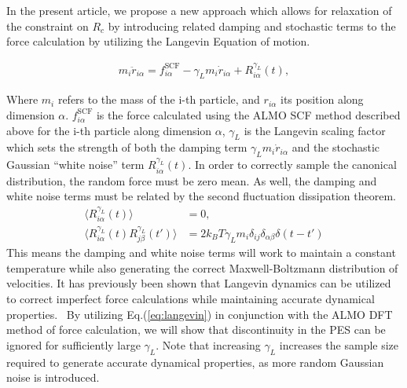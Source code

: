\documentclass[10pt,aps,prl,twocolumn,amsmath,amssymb,superscriptaddress,longbibliography]{revtex4-1}
\begin{document}
In the present article, we propose a new approach which allows for relaxation of the constraint on $R_{c}$ by introducing related damping and stochastic terms to the force calculation by utilizing the Langevin Equation of motion.~\cite{a:Kubo-1986}

\begin{align}
\label{eq:langevin}
m_i \ddot{r}_{i\alpha} = f^{\text{SCF}}_{i\alpha} - \gamma_L m_i \dot{r}_{i\alpha} + R^{\gamma_L}_{i\alpha} (t),
\end{align}

Where $m_i$ refers to the mass of the i-th particle, and $r_{i\alpha}$ its position along dimension $\alpha$. 
$f^{\text{SCF}}_{i\alpha}$ is the force calculated using the ALMO SCF method described above for the i-th particle along dimension $\alpha$, $\gamma_L$ is the Langevin scaling factor which sets the strength of both the damping term  $\gamma_L m_i \dot{r}_{i\alpha}$ and the stochastic Gaussian ``white noise'' term $R^{\gamma_L}_{i\alpha} (t)$. 
In order to correctly sample the canonical distribution, the random force must be zero mean. 
As well, the damping and white noise terms must be related by the second fluctuation dissipation theorem.~\cite{a:Kubo-1986,a:langevin-why,b:tuckerman-stat}
%
\begin{align}
\label{eq:stochastic}
\langle R^{\gamma_L}_{i\alpha} (t) \rangle &= 0, \\
\langle R^{\gamma_L}_{i\alpha} (t)  R^{\gamma_L}_{j\beta} (t') \rangle &= 2 k_B T \gamma_L m_i \delta_{ij} \delta_{\alpha\beta} \delta(t-t')
\end{align}
%
This means the damping and white noise terms will work to maintain a constant temperature while also generating the correct Maxwell-Boltzmann distribution of velocities. 
It has previously been shown that Langevin dynamics can be utilized to correct imperfect force calculations while maintaining accurate dynamical properties.~\cite{a:langevin-why,a:2ndcpmd,b:tuckerman-stat,a:ceriotti} 
By utilizing Eq.(\ref{eq:langevin}) in conjunction with the ALMO DFT method of force calculation, we will show that discontinuity in the PES can be ignored for sufficiently large $\gamma_L$. 
Note that increasing $\gamma_L$ increases the sample size required to generate accurate dynamical properties, as more random Gaussian noise is introduced.
\end{document}
